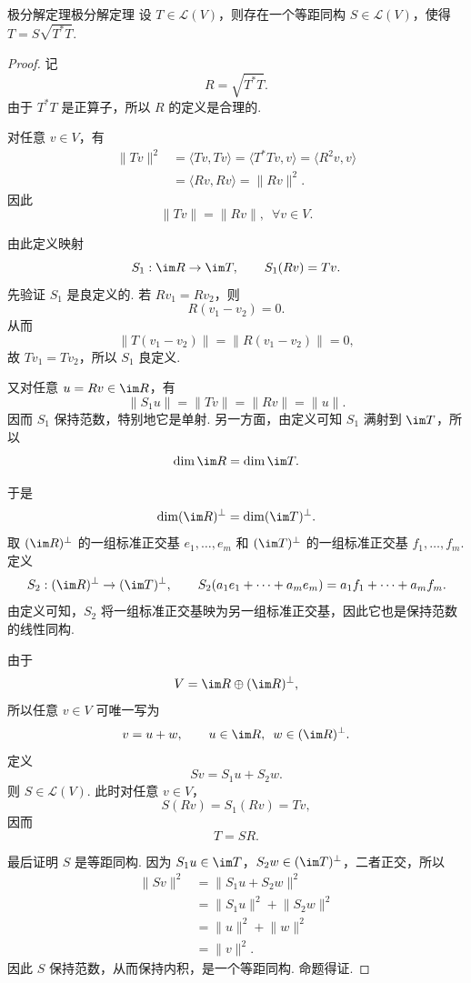 \begin{theorem}{极分解定理}{极分解定理} 
    设 $T \in \mathcal{L}(V)$，则存在一个等距同构 $S \in \mathcal{L}(V)$，使得 $T = S\sqrt{T^*T}$.
\end{theorem}

\begin{proof}
    记
    \[
        R = \sqrt{T^*T}.
    \]
    由于 $T^*T$ 是正算子，所以 $R$ 的定义是合理的.

    对任意 $v \in V$，有
    \begin{align*}
        \lVert Tv \rVert^2
         & = \langle Tv, Tv \rangle
          = \langle T^*Tv, v \rangle
          = \langle R^2v, v \rangle  \\
         & = \langle Rv, Rv \rangle
          = \lVert Rv \rVert^2.
    \end{align*}
    因此
    \[
        \lVert Tv \rVert = \lVert Rv \rVert,\enspace \forall v \in V.
    \]

    由此定义映射
    \[
        S_1 : \im R \to \im T,\qquad S_1(Rv) = Tv.
    \]
    先验证 $S_1$ 是良定义的. 若 $Rv_1 = Rv_2$，则
    \[
        R(v_1-v_2)=0.
    \]
    从而
    \[
        \lVert T(v_1-v_2) \rVert = \lVert R(v_1-v_2) \rVert = 0,
    \]
    故 $Tv_1 = Tv_2$，所以 $S_1$ 良定义.

    又对任意 $u = Rv \in \im R$，有
    \[
        \lVert S_1u \rVert = \lVert Tv \rVert = \lVert Rv \rVert = \lVert u \rVert.
    \]
    因而 $S_1$ 保持范数，特别地它是单射. 另一方面，由定义可知 $S_1$ 满射到 $\im T$，所以
    \[
        \dim \im R = \dim \im T.
    \]

    于是
    \[
        \dim (\im R)^\perp = \dim (\im T)^\perp.
    \]
    取 $(\im R)^\perp$ 的一组标准正交基 $e_1, \ldots, e_m$ 和 $(\im T)^\perp$ 的一组标准正交基 $f_1, \ldots, f_m$. 定义
    \[
        S_2 : (\im R)^\perp \to (\im T)^\perp,\qquad
        S_2(a_1e_1 + \cdots + a_me_m) = a_1f_1 + \cdots + a_mf_m.
    \]
    由定义可知，$S_2$ 将一组标准正交基映为另一组标准正交基，因此它也是保持范数的线性同构.

    由于
    \[
        V = \im R \oplus (\im R)^\perp,
    \]
    所以任意 $v \in V$ 可唯一写为
    \[
        v = u + w,\qquad u \in \im R,\enspace w \in (\im R)^\perp.
    \]
    定义
    \[
        Sv = S_1u + S_2w.
    \]
    则 $S \in \mathcal{L}(V)$. 此时对任意 $v \in V$，
    \[
        S(Rv) = S_1(Rv) = Tv,
    \]
    因而
    \[
        T = SR.
    \]

    最后证明 $S$ 是等距同构. 因为 $S_1u \in \im T$，$S_2w \in (\im T)^\perp$，二者正交，所以
    \begin{align*}
        \lVert Sv \rVert^2
         & = \lVert S_1u + S_2w \rVert^2 \\
         & = \lVert S_1u \rVert^2 + \lVert S_2w \rVert^2 \\
         & = \lVert u \rVert^2 + \lVert w \rVert^2 \\
         & = \lVert v \rVert^2.
    \end{align*}
    因此 $S$ 保持范数，从而保持内积，是一个等距同构. 命题得证.
\end{proof}

